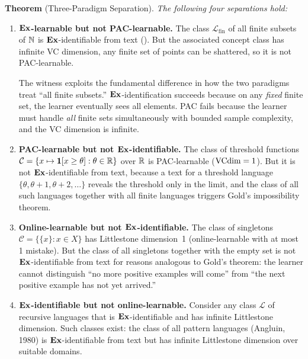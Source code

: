 \begin{separation}
\textbf{Theorem} (Three-Paradigm Separation). \textit{The following four separations hold:}

\begin{enumerate}[label=(\alph*),leftmargin=*,itemsep=4pt]
\item \textbf{$\mathbf{Ex}$-learnable but not PAC-learnable.} The class $\mathcal{L}_{\mathrm{fin}}$ of all finite subsets of $\mathbb{N}$ is $\mathbf{Ex}$-identifiable from text (). But the associated concept class has infinite VC dimension, any finite set of points can be shattered, so it is not PAC-learnable.

The witness exploits the fundamental difference in how the two paradigms treat ``all finite subsets.'' $\mathbf{Ex}$-identification succeeds because on any \emph{fixed} finite set, the learner eventually sees all elements. PAC fails because the learner must handle \emph{all} finite sets simultaneously with bounded sample complexity, and the VC dimension is infinite.

\item \textbf{PAC-learnable but not $\mathbf{Ex}$-identifiable.} The class of threshold functions $\mathcal{C} = \{x \mapsto \mathbf{1}[x \geq \theta] : \theta \in \mathbb{R}\}$ over $\mathbb{R}$ is PAC-learnable ($\mathrm{VCdim} = 1$). But it is not $\mathbf{Ex}$-identifiable from text, because a text for a threshold language $\{\theta, \theta+1, \theta+2, \ldots\}$ reveals the threshold only in the limit, and the class of all such languages together with all finite languages triggers Gold's impossibility theorem.

\item \textbf{Online-learnable but not $\mathbf{Ex}$-identifiable.} The class of singletons $\mathcal{C} = \{\{x\} : x \in X\}$ has Littlestone dimension~1 (online-learnable with at most 1 mistake). But the class of all singletons together with the empty set is not $\mathbf{Ex}$-identifiable from text for reasons analogous to Gold's theorem: the learner cannot distinguish ``no more positive examples will come'' from ``the next positive example has not yet arrived.''

\item \textbf{$\mathbf{Ex}$-identifiable but not online-learnable.} Consider any class $\mathcal{L}$ of recursive languages that is $\mathbf{Ex}$-identifiable and has infinite Littlestone dimension. Such classes exist: the class of all pattern languages (Angluin, 1980) is $\mathbf{Ex}$-identifiable from text but has infinite Littlestone dimension over suitable domains.
\end{enumerate}
\end{separation}


